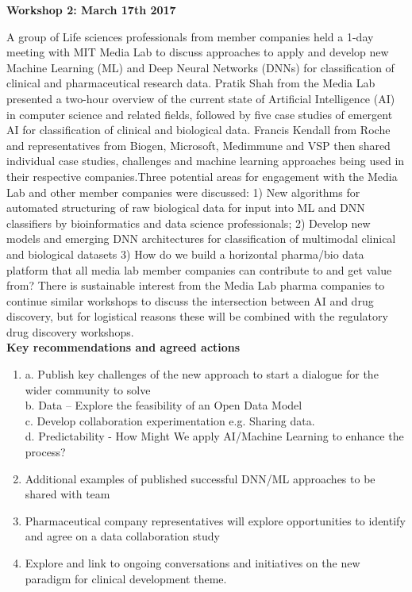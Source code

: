 \textbf{Workshop 2: March 17th 2017}

A group of Life sciences professionals from member companies held a 1-day meeting with MIT Media Lab to discuss approaches to apply and develop new Machine Learning (ML) and Deep Neural Networks (DNNs) for classification of clinical and pharmaceutical research data. Pratik Shah from the Media Lab presented a two-hour overview of the current state of Artificial Intelligence (AI) in computer science and related fields, followed by five case studies of emergent AI for classification of clinical and biological data.  Francis Kendall from Roche and representatives from Biogen, Microsoft, Medimmune and VSP then shared individual case studies, challenges and machine learning approaches being used in their respective companies.Three potential areas for engagement with the Media Lab and other member companies were discussed:
1) New algorithms for automated structuring of raw biological data for input into ML and DNN classifiers by bioinformatics and data science professionals;
2) Develop new models and emerging DNN architectures for classification of multimodal clinical and biological datasets
3) How do we build a horizontal pharma/bio data platform that all media lab member companies can contribute to and get value from? There is sustainable interest from the Media Lab pharma companies to continue similar workshops to discuss the intersection between AI and drug discovery, but for logistical reasons these will be combined with the regulatory drug discovery  workshops. \\
 
\textbf{Key recommendations and agreed actions}
\begin{enumerate}
\item a. Publish key challenges of the new approach to start a dialogue for the wider community to solve \\
b. Data – Explore the feasibility of an Open Data Model \\
c. Develop collaboration experimentation e.g. Sharing data. \\
d. Predictability - How Might We apply AI/Machine Learning to enhance the process?
\item Additional examples of published successful DNN/ML approaches to be shared with team
\item Pharmaceutical company representatives will explore opportunities to identify and agree on a data collaboration study
\item Explore and link to ongoing conversations and initiatives on the new paradigm for clinical development theme.
\end{enumerate}

